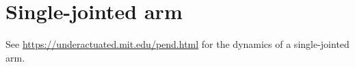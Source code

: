 \section{Single-jointed arm}

See \url{https://underactuated.mit.edu/pend.html} for the dynamics of a
single-jointed arm.
